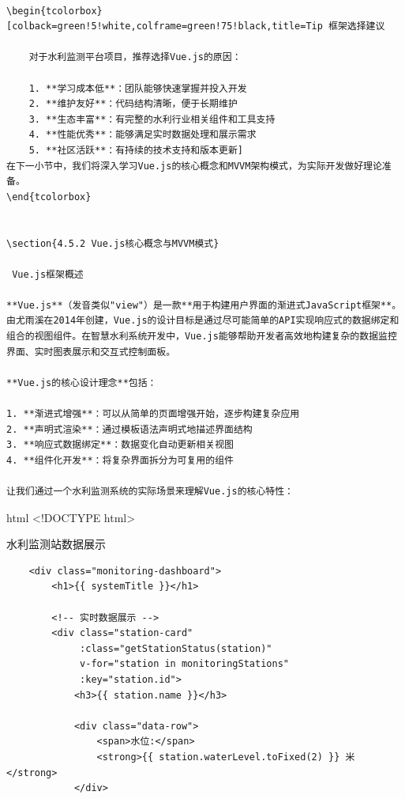 {{\begin{lstlisting}

\begin{tcolorbox}[colback=green!5!white,colframe=green!75!black,title=Tip 框架选择建议
    
    对于水利监测平台项目，推荐选择Vue.js的原因：
    
    1. **学习成本低**：团队能够快速掌握并投入开发
    2. **维护友好**：代码结构清晰，便于长期维护
    3. **生态丰富**：有完整的水利行业相关组件和工具支持
    4. **性能优秀**：能够满足实时数据处理和展示需求
    5. **社区活跃**：有持续的技术支持和版本更新]
在下一小节中，我们将深入学习Vue.js的核心概念和MVVM架构模式，为实际开发做好理论准备。
\end{tcolorbox}


\section{4.5.2 Vue.js核心概念与MVVM模式}

 Vue.js框架概述

**Vue.js**（发音类似"view"）是一款**用于构建用户界面的渐进式JavaScript框架**。由尤雨溪在2014年创建，Vue.js的设计目标是通过尽可能简单的API实现响应式的数据绑定和组合的视图组件。在智慧水利系统开发中，Vue.js能够帮助开发者高效地构建复杂的数据监控界面、实时图表展示和交互式控制面板。

**Vue.js的核心设计理念**包括：

1. **渐进式增强**：可以从简单的页面增强开始，逐步构建复杂应用
2. **声明式渲染**：通过模板语法声明式地描述界面结构
3. **响应式数据绑定**：数据变化自动更新相关视图
4. **组件化开发**：将复杂界面拆分为可复用的组件

让我们通过一个水利监测系统的实际场景来理解Vue.js的核心特性：
\end{lstlisting}

html \textless!DOCTYPE html\textgreater{}

水利监测站数据展示

\begin{verbatim}
    <div class="monitoring-dashboard">
        <h1>{{ systemTitle }}</h1>
        
        <!-- 实时数据展示 -->
        <div class="station-card" 
             :class="getStationStatus(station)" 
             v-for="station in monitoringStations" 
             :key="station.id">
            <h3>{{ station.name }}</h3>
            
            <div class="data-row">
                <span>水位:</span>
                <strong>{{ station.waterLevel.toFixed(2) }} 米</strong>
            </div>
            

\end{verbatim}}}

